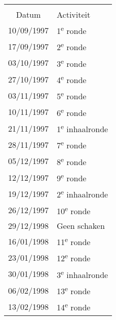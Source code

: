 \documentclass[a4paper]{scrreprt}
\begin{document}
\begin{landscape}
\begin{center}
   \newpage
   \begin{tabular}{ c l }
    \rowcolor{headingkleur}
    \multicolumn{2}{c}{\large\color{headingtekstkleur}Kalender} \\
    \rowcolor{headingkleur}
    \color{headingtekstkleur}Datum & \color{headingtekstkleur}Activiteit \\
\rowcolor{headingkleur!25}
    10/09/1997 & 1\textsuperscript{e} ronde \\
    \hline
\rowcolor{headingkleur!25}
    17/09/1997 & 2\textsuperscript{e} ronde \\
    \hline
\rowcolor{headingkleur!25}
    03/10/1997 & 3\textsuperscript{e} ronde \\
    \hline
\rowcolor{headingkleur!25}
    27/10/1997 & 4\textsuperscript{e} ronde \\
    \hline
\rowcolor{headingkleur!25}
    03/11/1997 & 5\textsuperscript{e} ronde \\
    \hline
\rowcolor{headingkleur!25}
    10/11/1997 & 6\textsuperscript{e} ronde \\
    \hline
\rowcolor{headingkleur!10}
    21/11/1997 & 1\textsuperscript{e} inhaalronde \\
    \hline
\rowcolor{headingkleur!25}
    28/11/1997 & 7\textsuperscript{e} ronde \\
    \hline
\rowcolor{headingkleur!25}
    05/12/1997 & 8\textsuperscript{e} ronde \\
    \hline
\rowcolor{headingkleur!25}
    12/12/1997 & 9\textsuperscript{e} ronde \\
    \hline
\rowcolor{headingkleur!10}
    19/12/1997 & 2\textsuperscript{e} inhaalronde \\
    \hline
\rowcolor{headingkleur!25}
    26/12/1997 & 10\textsuperscript{e} ronde \\
    \hline
    29/12/1998 & Geen schaken \\
    \hline
\rowcolor{headingkleur!25}
    16/01/1998 & 11\textsuperscript{e} ronde \\
    \hline
\rowcolor{headingkleur!25}
    23/01/1998 & 12\textsuperscript{e} ronde \\
    \hline
\rowcolor{headingkleur!10}
    30/01/1998 & 3\textsuperscript{e} inhaalronde \\
    \hline
\rowcolor{headingkleur!25}
    06/02/1998 & 13\textsuperscript{e} ronde \\
    \hline
\rowcolor{headingkleur!25}
    13/02/1998 & 14\textsuperscript{e} ronde \\

\end{tabular}
\end{center}
\end{landscape}
\end{document}
